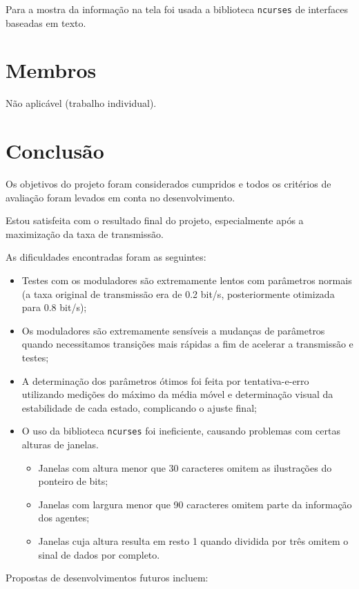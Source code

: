 \documentclass[titlepage,twocolumn]{article}
\begin{document}
Para a mostra da informação na tela foi usada a biblioteca \texttt{ncurses} de interfaces baseadas em texto.

\section{Membros}
Não aplicável (trabalho individual).
\section{Conclusão}

Os objetivos do projeto foram considerados cumpridos e todos os critérios de avaliação foram levados em conta no desenvolvimento.

Estou satisfeita com o resultado final do projeto, especialmente após a maximização da taxa de transmissão.

As dificuldades encontradas foram as seguintes:

\begin{itemize}
    \item Testes com os moduladores são extremamente lentos com parâmetros normais (a taxa original de transmissão era de 0.2 bit/s, posteriormente otimizada para 0.8 bit/s);
    \item Os moduladores são extremamente sensíveis a mudanças de parâmetros quando necessitamos transições mais rápidas a fim de acelerar a transmissão e testes;
    \item A determinação dos parâmetros ótimos foi feita por ten\-tativa-e-erro utilizando medições do máximo da média móvel e determinação visual da estabilidade de cada estado, complicando o ajuste final;
    \item O uso da biblioteca \texttt{ncurses} foi ineficiente, causando problemas com certas alturas de janelas.
    \begin{itemize}
        \item Janelas com altura menor que 30 caracteres omitem as ilustrações do ponteiro de bits;
        \item Janelas com largura menor que 90 caracteres omitem parte da informação dos agentes;
        \item Janelas cuja altura resulta em resto 1 quando dividida por três omitem o sinal de dados por completo.
    \end{itemize}
\end{itemize}

Propostas de desenvolvimentos futuros incluem:
\end{document}
